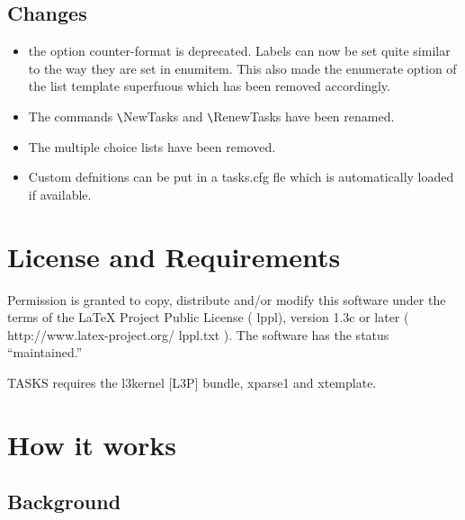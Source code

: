 \documentclass[a4paper,12pt,indent]{article}
\begin{document}
\subsection*{Changes}

\begin{itemize}

 \item   the option counter-format is deprecated. Labels can now be set quite similar to the
way they are set in enumitem. This also made the enumerate option of the list template
superfuous which has been removed accordingly.

\item The commands \verb|\|\textcolor{Tasks}{NewTasks} and \verb|\|\textcolor{Tasks}{RenewTasks} have been renamed.

\item The multiple choice lists have been removed.

\item Custom defnitions can be put in a tasks.cfg fle which is automatically loaded if available.

\end{itemize}

\section{License and Requirements}

Permission is granted to copy, distribute and/or modify this software under the terms of the
\LaTeX{} Project Public License ( lppl), version 1.3c or later ( http://www.latex-project.org/
lppl.txt ). The software has the status ``maintained.''

\textcolor{Tasks}{TASKS} requires the l3kernel [L3P] bundle, xparse1 and xtemplate.

\section{How it works}

\subsection{Background}
\end{document}
